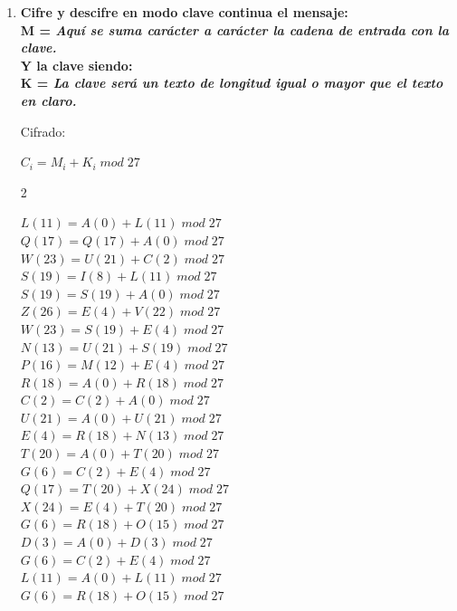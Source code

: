\documentclass{article}
\begin{document}
\begin{enumerate}
\begin{tabular}{|c|c|c|c|c|c|}
\end{tabular}
\label{tabla:sencilla}


\item \textbf{Cifre y descifre en modo clave continua el mensaje: \\ M = \emph{ Aquí se suma carácter a carácter la cadena de entrada con la clave.} \\ Y la clave siendo: \\K = \emph{ La clave será un texto de longitud igual o mayor que el texto en claro.}}


Cifrado:

$C_i = M_i +K_i \; mod \; 27 $

\begin{multicols}{2}

$L (11) = A (0) + L (11) \; mod \; 27$ \\
$Q (17) = Q (17) + A (0) \; mod \; 27$ \\
$W (23) = U (21) + C (2) \; mod \; 27$ \\
$S (19) = I (8) + L (11) \; mod \; 27$ \\
$S (19) = S (19) + A (0) \; mod \; 27$ \\
$Z (26) = E (4) + V (22) \; mod \; 27$ \\
$W (23) = S (19) + E (4) \; mod \; 27$ \\
$N (13) = U (21) + S (19) \; mod \; 27$ \\
$P (16) = M (12) + E (4) \; mod \; 27$ \\
$R (18) = A (0) + R (18) \; mod \; 27$ \\
$C (2) = C (2) + A (0) \; mod \; 27$ \\
$U (21) = A (0) + U (21) \; mod \; 27$ \\
$E (4) = R (18) + N (13) \; mod \; 27$ \\
$T (20) = A (0) + T (20) \; mod \; 27$ \\
$G (6) = C (2) + E (4) \; mod \; 27$ \\
$Q (17) = T (20) + X (24) \; mod \; 27$ \\
$X (24) = E (4) + T (20) \; mod \; 27$ \\
$G (6) = R (18) + O (15) \; mod \; 27$ \\
$D (3) = A (0) + D (3) \; mod \; 27$ \\
$G (6) = C (2) + E (4) \; mod \; 27$ \\
$L (11) = A (0) + L (11) \; mod \; 27$ \\
$G (6) = R (18) + O (15) \; mod \; 27$ \\

\end{multicols}
\end{enumerate}
\end{document}
